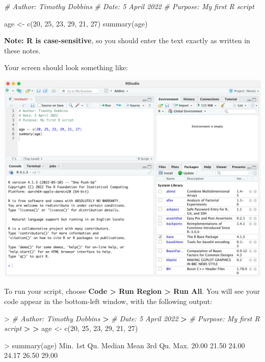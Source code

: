 \documentclass[
]{memoir}
\newenvironment{Shaded}{\begin{snugshade}}{\end{snugshade}}
\newcommand{\CommentTok}[1]{\textcolor[rgb]{0.56,0.35,0.01}{\textit{#1}}}
\newcommand{\DecValTok}[1]{\textcolor[rgb]{0.00,0.00,0.81}{#1}}
\newcommand{\ErrorTok}[1]{\textcolor[rgb]{0.64,0.00,0.00}{\textbf{#1}}}
\newcommand{\FloatTok}[1]{\textcolor[rgb]{0.00,0.00,0.81}{#1}}
\newcommand{\FunctionTok}[1]{\textcolor[rgb]{0.00,0.00,0.00}{#1}}
\newcommand{\NormalTok}[1]{#1}
\newcommand{\OtherTok}[1]{\textcolor[rgb]{0.56,0.35,0.01}{#1}}
\newcommand{\SpecialCharTok}[1]{\textcolor[rgb]{0.00,0.00,0.00}{#1}}
\begin{document}
\begin{Shaded}
\begin{Highlighting}[]
\CommentTok{\# Author: Timothy Dobbins}
\CommentTok{\# Date: 5 April 2022}
\CommentTok{\# Purpose: My first R script}

\NormalTok{age }\OtherTok{\textless{}{-}} \FunctionTok{c}\NormalTok{(}\DecValTok{20}\NormalTok{, }\DecValTok{25}\NormalTok{, }\DecValTok{23}\NormalTok{, }\DecValTok{29}\NormalTok{, }\DecValTok{21}\NormalTok{, }\DecValTok{27}\NormalTok{)}
\FunctionTok{summary}\NormalTok{(age)}
\end{Highlighting}
\end{Shaded}

\textbf{Note: R is case-sensitive}, so you should enter the text exactly as written in these notes.

Your screen should look something like:

\includegraphics[width=1\linewidth]{img/RStudio-screenshot-02}

To run your script, choose \textbf{Code \textgreater{} Run Region \textgreater{} Run All}. You will see your code appear in the bottom-left window, with the following output:

\begin{Shaded}
\begin{Highlighting}[]
\SpecialCharTok{\textgreater{}} \CommentTok{\# Author: Timothy Dobbins}
\ErrorTok{\textgreater{}} \CommentTok{\# Date: 5 April 2022}
\ErrorTok{\textgreater{}} \CommentTok{\# Purpose: My first R script}
\ErrorTok{\textgreater{}} 
\ErrorTok{\textgreater{}}\NormalTok{ age }\OtherTok{\textless{}{-}} \FunctionTok{c}\NormalTok{(}\DecValTok{20}\NormalTok{, }\DecValTok{25}\NormalTok{, }\DecValTok{23}\NormalTok{, }\DecValTok{29}\NormalTok{, }\DecValTok{21}\NormalTok{, }\DecValTok{27}\NormalTok{)}

\SpecialCharTok{\textgreater{}} \FunctionTok{summary}\NormalTok{(age)}
\NormalTok{   Min. 1st Qu.  Median    Mean 3rd Qu.    Max. }
  \FloatTok{20.00}   \FloatTok{21.50}   \FloatTok{24.00}   \FloatTok{24.17}   \FloatTok{26.50}   \FloatTok{29.00} 
\end{Highlighting}
\end{Shaded}
\end{document}
